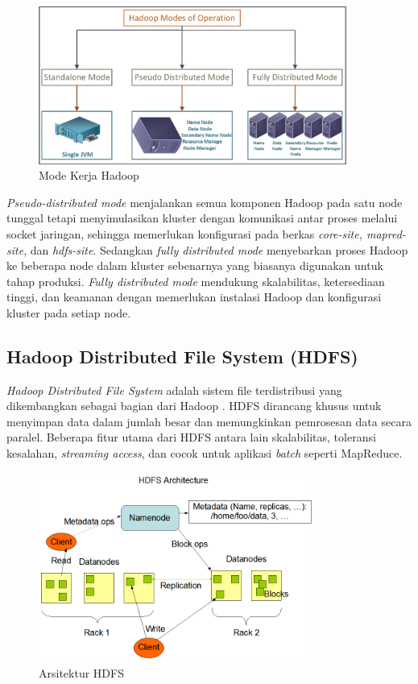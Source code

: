 \begin{figure}[h!]
    \centering
    \includegraphics[width=0.9\textwidth]{figures/ch02/hadoop-modes}
    \caption{Mode Kerja Hadoop \cite{khataiImplementationTextMining2021}}
    \label{fig:hadoop-modes}
\end{figure}

\textit{Pseudo-distributed mode} menjalankan semua komponen Hadoop pada satu node tunggal tetapi menyimulasikan kluster dengan komunikasi antar proses melalui socket jaringan, sehingga memerlukan konfigurasi pada berkas \textit{core-site, mapred-site}, dan \textit{hdfs-site}. Sedangkan \textit{fully distributed mode} menyebarkan proses Hadoop ke beberapa node dalam kluster sebenarnya yang biasanya digunakan untuk tahap produksi. \textit{Fully distributed mode} mendukung skalabilitas, ketersediaan tinggi, dan keamanan dengan memerlukan instalasi Hadoop dan konfigurasi kluster pada setiap node.

\subsection{Hadoop Distributed File System (HDFS)}
\textit{Hadoop Distributed File System} adalah sistem file terdistribusi yang dikembangkan sebagai bagian dari Hadoop \cite{abhishekIntegratedHadoopCloud2017}. HDFS dirancang khusus untuk menyimpan data dalam jumlah besar dan memungkinkan pemrosesan data secara paralel. Beberapa fitur utama dari HDFS antara lain skalabilitas, toleransi kesalahan, \textit{streaming access}, dan cocok untuk aplikasi \textit{batch} seperti MapReduce.

\begin{figure}[h!]
    \centering
    \includegraphics[width=0.8\textwidth]{figures/ch02/hdfsarchitecture}
    \caption{Arsitektur HDFS \cite{ApacheHadoopHDFS}}
    \label{fig:hdfs-arch}
\end{figure}

